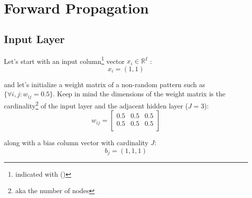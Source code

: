 \documentclass{article}
\begin{document}



\newpage
\section{Forward Propagation}
\subsection{Input Layer}
Let's start with an input column\footnote{indicated with ()} vector $x_i \in \mathbb{R}^I$ :
\begin{equation*}
    x_i = (1, 1)
\end{equation*}

and let's initialize a weight matrix of a non-random pattern such as $\{\forall i,j : w_{ij} =  0.5 \}$. Keep in mind the dimensions of the weight matrix is the cardinality\footnote{aka the number of nodes} of the input layer and the adjacent hidden layer ($J=3$):
\begin{equation*}
    w_{ij} =
            \begin{bmatrix}
            0.5 & 0.5 & 0.5 \\
            0.5 & 0.5 & 0.5 \\
            \end{bmatrix}
\end{equation*}

along with a bias column vector with cardinality $J$:
\begin{equation*}
    b_j = (1,1,1)
\end{equation*}
\end{document}
